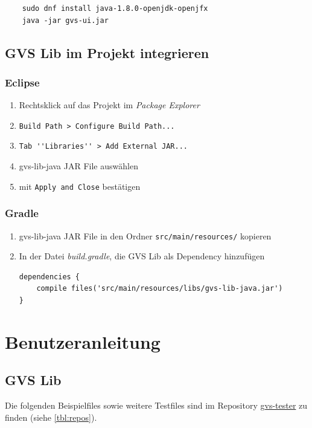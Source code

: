 \documentclass[11pt,a4paper,english,oneside]{book}
\numberwithin{equation}{chapter}
\begin{document}
	\begin{lstlisting}
	sudo dnf install java-1.8.0-openjdk-openjfx
	java -jar gvs-ui.jar
	\end{lstlisting}

	\clearpage
	
	\section{GVS Lib im Projekt integrieren}
	\subsection{Eclipse}
	\begin{enumerate}
		\item Rechtsklick auf das Projekt im \textit{Package Explorer}
		\item \lstinline{Build Path > Configure Build Path...}
		\item \lstinline{Tab ''Libraries'' > Add External JAR...}
		\item gvs-lib-java JAR File auswählen
		\item mit \lstinline{Apply and Close} bestätigen
	\end{enumerate}

	\subsection{Gradle}
	\begin{enumerate}
		\item gvs-lib-java JAR File in den Ordner \lstinline{src/main/resources/} kopieren
		\item In der Datei \textit{build.gradle}, die GVS Lib als Dependency hinzufügen
\begin{lstlisting}
dependencies {
	compile files('src/main/resources/libs/gvs-lib-java.jar')
}
\end{lstlisting}
	\end{enumerate}

	
	
	\chapter{Benutzeranleitung}
	\section{GVS Lib}
	Die folgenden Beispielfiles sowie weitere Testfiles sind im Repository \href{https://github.com/Graphs-Visualization-Service/gvs-tester}{gvs-tester} zu finden (siehe \ref{tbl:repos}).
	
\end{document}
